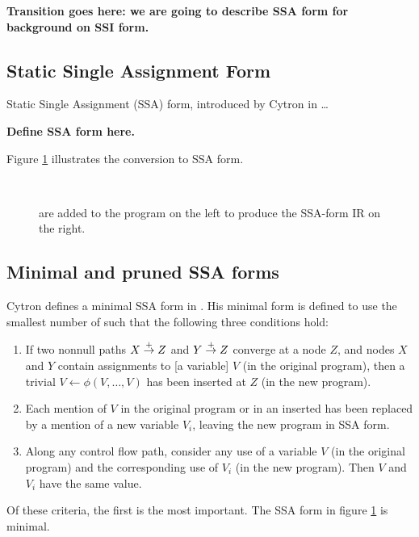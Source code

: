 \documentclass[12pt,notitlepage,twoside]{article}
\begin{document}
\textbf{Transition goes here: we are going to describe SSA form for
background on SSI form.}

\subsection{Static Single Assignment Form}
Static Single Assignment (SSA) form, introduced by Cytron in
\cite{cytron89:ssa}\ldots

\textbf{Define SSA form here.}

Figure \ref{fig:tossa} illustrates the conversion to SSA form.
\begin{figure}\label{fig:tossa}
\begin{center}
 \vline\ 
\end{center}
\caption{ are added to the program on the left to
produce the SSA-form IR on the right.}
\end{figure}

\subsection{Minimal and pruned SSA forms}
Cytron defines a minimal SSA form in \cite{cytron91:ssa}.  His minimal
form is defined to use the smallest number of \phifunction{s} such
that the following three conditions hold:
\begin{enumerate}
\item If two nonnull paths $X \stackrel{+}{\rightarrow} Z$ and $Y \stackrel{+}{\rightarrow} Z$
converge at a node $Z$, and nodes $X$ and $Y$ contain assignments to
[a variable] $V$ (in the original program), then a trivial
\phifunction{} $V \leftarrow \phi(V, \ldots, V)$ has been inserted at
$Z$ (in the new program). \label{criteria1}
\item Each mention of $V$ in the original program or in an inserted
\phifunction{} has been replaced by a mention of a new variable $V_i$,
leaving the new program in SSA form.
\item Along any control flow path, consider any use of a variable $V$
(in the original program) and the corresponding use of $V_i$ (in the
new program).  Then $V$ and $V_i$ have the same value.
\end{enumerate}
Of these criteria, the first %
is the most important.
The SSA form in figure \ref{fig:tossa} is minimal.
\end{document}
